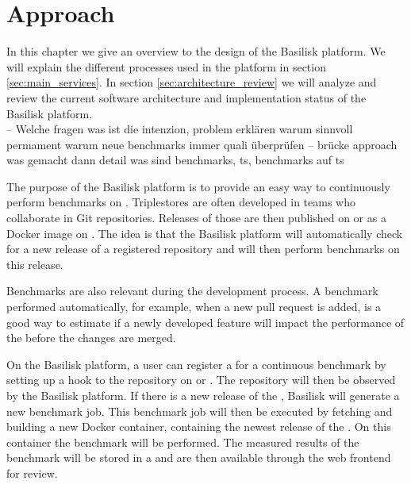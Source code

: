 \chapter{Approach}
\label{ch:approach}

In this chapter we give an overview to the design of the Basilisk platform.
We will explain the different processes used in the platform in section \ref{sec:main_services}.
In section \ref{sec:architecture_review} we will analyze and review the current software architecture and implementation status of the Basilisk platform.
\\

-- Welche fragen
was ist die intenzion, 
problem erklären
warum sinnvoll permament
warum neue benchmarks
immer quali überprüfen
-- brücke approach
was gemacht
dann detail
was sind benchmarks, ts, benchmarks auf ts

The purpose of the Basilisk platform is to provide an easy way to continuously perform benchmarks on \tsp{}.
Triplestores are often developed in teams who collaborate in Git repositories.
Releases of those \tsp{} are then published on \gh{} or as a Docker image on \dockh{}.
The idea is that the Basilisk platform will automatically check for a new release of a registered \ts{} repository and will then perform benchmarks on this release.


Benchmarks are also relevant during the development process.
A benchmark performed automatically, for example, when a new pull request is added, is a good way to estimate if a newly developed feature will impact the performance of the \ts{} before the changes are merged.

On the Basilisk platform, a user can register a \ts{} for a continuous benchmark by setting up a hook to the repository on \gh{} or \dockh{}.
The repository will then be observed by the Basilisk platform.
If there is a new release of the \ts{}, Basilisk will generate a new benchmark job.
This benchmark job will then be executed by fetching and building a new Docker container, containing the newest release of the \ts{}.
On this container the benchmark will be performed.
The measured results of the benchmark will be stored in a \ts{} and are then available through the web frontend for review.
\\

